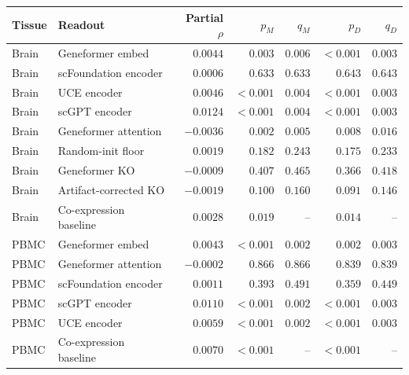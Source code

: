 \begin{tabular}{llrrrrr}
\toprule
Tissue & Readout & Partial $\rho$ & $p_M$ & $q_M$ & $p_D$ & $q_D$ \\ 
\midrule
Brain & Geneformer embed & $0.0044$ & $0.003$ & $0.006$ & $<0.001$ & $0.003$ \\
Brain & scFoundation encoder & $0.0006$ & $0.633$ & $0.633$ & $0.643$ & $0.643$ \\
Brain & UCE encoder & $0.0046$ & $<0.001$ & $0.004$ & $<0.001$ & $0.003$ \\
Brain & scGPT encoder & $0.0124$ & $<0.001$ & $0.004$ & $<0.001$ & $0.003$ \\
Brain & Geneformer attention & $-0.0036$ & $0.002$ & $0.005$ & $0.008$ & $0.016$ \\
Brain & Random-init floor & $0.0019$ & $0.182$ & $0.243$ & $0.175$ & $0.233$ \\
Brain & Geneformer KO & $-0.0009$ & $0.407$ & $0.465$ & $0.366$ & $0.418$ \\
Brain & Artifact-corrected KO & $-0.0019$ & $0.100$ & $0.160$ & $0.091$ & $0.146$ \\
Brain & Co-expression baseline & $0.0028$ & $0.019$ & -- & $0.014$ & -- \\
PBMC & Geneformer embed & $0.0043$ & $<0.001$ & $0.002$ & $0.002$ & $0.003$ \\
PBMC & Geneformer attention & $-0.0002$ & $0.866$ & $0.866$ & $0.839$ & $0.839$ \\
PBMC & scFoundation encoder & $0.0011$ & $0.393$ & $0.491$ & $0.359$ & $0.449$ \\
PBMC & scGPT encoder & $0.0110$ & $<0.001$ & $0.002$ & $<0.001$ & $0.003$ \\
PBMC & UCE encoder & $0.0059$ & $<0.001$ & $0.002$ & $<0.001$ & $0.003$ \\
PBMC & Co-expression baseline & $0.0070$ & $<0.001$ & -- & $<0.001$ & -- \\
\bottomrule
\end{tabular}
